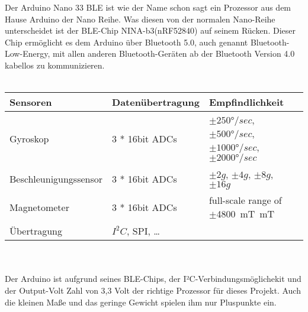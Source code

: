 Der Arduino Nano 33 BLE ist wie der Name schon sagt ein Prozessor aus dem Hause Arduino
der Nano Reihe. Was diesen von der normalen Nano-Reihe unterscheidet ist der BLE-Chip
NINA-b3(nRF52840) auf seinem Rücken. Dieser Chip ermöglicht es dem Arduino über 
Bluetooth 5.0, auch genannt Bluetooth-Low-Energy, mit allen anderen Bluetooth-Geräten ab 
der Bluetooth Version 4.0 kabellos zu kommunizieren.\\
\\
\begin{tabularx}{0.8\textwidth}{l|X|XX}
Sensoren & Datenübertragung & Empfindlichkeit                                     \\
\hline
Gyroskop & 3 * 16bit ADCs & $\pm250°/sec$, $\pm500°/sec$, $\pm1000°/sec$, $\pm2000°/sec$\\ 
\hline
Beschleunigungssensor & 3 * 16bit ADCs & $\pm2g$, $\pm4g$, $\pm8g$, $\pm16g$\\
\hline
Magnetometer & 3 * 16bit ADCs & full-scale range of $\pm$\SI{4800}{\milli\tesla\meter}T \\
\hline
Übertragung & $I^2C$, SPI, \dots & \\
\end{tabularx}
\\
\\
Der Arduino ist aufgrund seines BLE-Chips, der I²C-Verbindungsmöglichekit und der 
Output-Volt Zahl von 3,3 Volt der richtige Prozessor für dieses Projekt. Auch die 
kleinen Maße und das geringe Gewicht spielen ihm nur Pluspunkte ein.